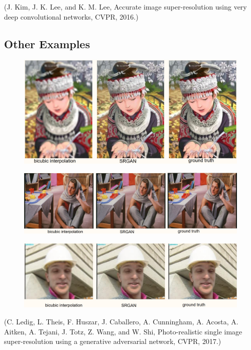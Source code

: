 \documentclass{report}
\begin{document}
\begin{definition}[8.7][VDSR]
    (J. Kim, J. K. Lee, and K. M. Lee, Accurate image super-resolution using very deep convolutional networks, CVPR, 2016.)
\end{definition}

\subsection{Other Examples}

\begin{example}[8.8][SRGAN]
    \begin{figure}[H]
        \centering
        \includegraphics[width=1.0\textwidth]{.././assets/8.7.png}
    \end{figure}

    \begin{figure}[H]
        \centering
        \includegraphics[width=1.0\textwidth]{.././assets/8.8.png}
    \end{figure}

    \begin{figure}[H]
        \centering
        \includegraphics[width=1.0\textwidth]{.././assets/8.9.png}
    \end{figure}

    (C. Ledig, L. Theis, F. Huszar, J. Caballero, A. Cunningham, A. Acosta, A. Aitken, A. Tejani, J. Totz, Z. Wang, and W. Shi, Photo-realistic single image super-resolution using a generative adversarial network, CVPR, 2017.)
\end{example}
\end{document}
